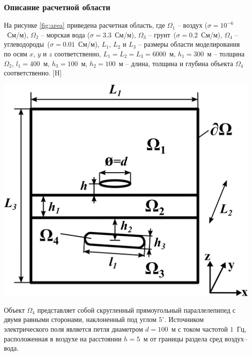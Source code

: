 \documentclass[a4paper,14pt]{article}
\makeatletter
\renewenvironment{figure}[1][\fps@figure]{
  \edef\@tempa{\noexpand\@float{figure}[#1]}
  \@tempa
  \addtocounter{foofigure}{1}
}{
  \end@float
}
\makeatother
\begin{document}
\subsubsection{Описание расчетной области}
На рисунке \ref{fig:area} приведена расчетная область, где $\Omega_1$ -- воздух ($\sigma = 10^{-6}$~См/м), $\Omega_2$ -- морская вода ($\sigma = 3.3$~См/м), $\Omega_3$ -- грунт~($\sigma = 0.2$~См/м), $\Omega_4$ -- углеводороды~($\sigma = 0.01$~См/м), $L_1$, $L_2$ и $L_3$ -- размеры области моделирования по осям $x$, $y$ и $z$ соответственно, $L_1 = L_2 = L_3 = 6000$~м, $h_1 = 300$~м -- толщина $\Omega_2$, $l_1 = 400$~м, $h_3 = 100$~м, $h_2 = 100$~м -- длина, толщина и глубина объекта $\Omega_4$ соответственно.
\begin{figure}[H]
	\centering
	\includegraphics[scale=1]{research-2/area_3layers_3.png}
	\caption{расчетная область}
	\label{fig:area}
\end{figure}

Объект $\Omega_4$ представляет собой скругленный прямоугольный параллелепипед с двумя равными сторонами, наклоненный под углом $5^{\circ}$. Источником электрического поля является петля диаметром $d = 100$~м с током частотой $1$~Гц, расположенная в воздухе на расстоянии $h = 5$~м от границы раздела сред воздух--вода.
\end{document}
